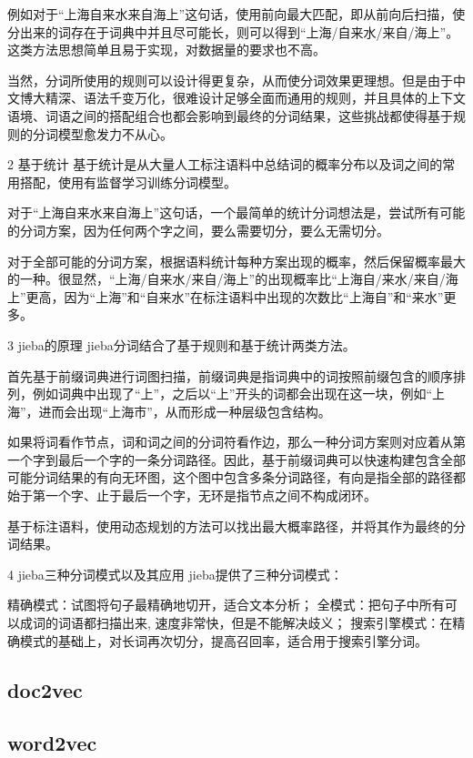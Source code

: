 \documentclass[UTF8]{ctexart}
\begin{document}
例如对于“上海自来水来自海上”这句话，使用前向最大匹配，即从前向后扫描，使分出来的词存在于词典中并且尽可能长，则可以得到“上海/自来水/来自/海上”。这类方法思想简单且易于实现，对数据量的要求也不高。

当然，分词所使用的规则可以设计得更复杂，从而使分词效果更理想。但是由于中文博大精深、语法千变万化，很难设计足够全面而通用的规则，并且具体的上下文语境、词语之间的搭配组合也都会影响到最终的分词结果，这些挑战都使得基于规则的分词模型愈发力不从心。

2 基于统计
基于统计是从大量人工标注语料中总结词的概率分布以及词之间的常用搭配，使用有监督学习训练分词模型。

对于“上海自来水来自海上”这句话，一个最简单的统计分词想法是，尝试所有可能的分词方案，因为任何两个字之间，要么需要切分，要么无需切分。

对于全部可能的分词方案，根据语料统计每种方案出现的概率，然后保留概率最大的一种。很显然，“上海/自来水/来自/海上”的出现概率比“上海自/来水/来自/海上”更高，因为“上海”和“自来水”在标注语料中出现的次数比“上海自”和“来水”更多。

3 jieba的原理
jieba分词结合了基于规则和基于统计两类方法。

首先基于前缀词典进行词图扫描，前缀词典是指词典中的词按照前缀包含的顺序排列，例如词典中出现了“上”，之后以“上”开头的词都会出现在这一块，例如“上海”，进而会出现“上海市”，从而形成一种层级包含结构。

如果将词看作节点，词和词之间的分词符看作边，那么一种分词方案则对应着从第一个字到最后一个字的一条分词路径。因此，基于前缀词典可以快速构建包含全部可能分词结果的有向无环图，这个图中包含多条分词路径，有向是指全部的路径都始于第一个字、止于最后一个字，无环是指节点之间不构成闭环。

基于标注语料，使用动态规划的方法可以找出最大概率路径，并将其作为最终的分词结果。

4 jieba三种分词模式以及其应用
jieba提供了三种分词模式：

精确模式：试图将句子最精确地切开，适合文本分析；
全模式：把句子中所有可以成词的词语都扫描出来, 速度非常快，但是不能解决歧义；
搜索引擎模式：在精确模式的基础上，对长词再次切分，提高召回率，适合用于搜索引擎分词。

\cite{xuqingtang}

\subsection{doc2vec}

\subsection{word2vec}
\end{document}
